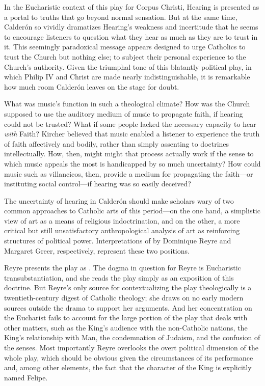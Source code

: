 In the Eucharistic context of this play for Corpus Christi, Hearing is presented as a portal to truths that go beyond normal sensation.
But at the same time, Calderón so vividly dramatizes Hearing's weakness and incertitude that he seems to encourage listeners to question what they hear as much as they are to trust in it.
This seemingly paradoxical message appears designed to urge Catholics to trust the Church but nothing else; to subject their personal experience to the Church's authority.
Given the triumphal tone of this blatantly political play, in which Philip IV and Christ are made nearly indistinguishable, it is remarkable how much room Calderón leaves on the stage for doubt.

What was music's function in such a theological climate?
How was the Church supposed to use the auditory medium of music to propagate faith, if hearing could not be trusted?
What if some people lacked the necessary capacity to hear  \emph{with} Faith?
Kircher believed that music enabled a listener to experience the truth of faith affectively and bodily, rather than simply assenting to doctrines intellectually.
How, then, might might that process actually work if the sense to which music appeals the most is handicapped by so much uncertainty?  
How could music such as villancicos, then, provide a medium for propagating the faith---or instituting social control---if hearing was so easily deceived?

The uncertainty of hearing in Calderón should make scholars wary of two common approaches to Catholic arts of this period---on the one hand, a simplistic view of art as a means of religious indoctrination, and on the other, a more critical but still unsatisfactory anthropological analysis of art as reinforcing structures of political power.
Interpretations of  by Dominique Reyre and Margaret Greer, respectively, represent these two positions.%
  \autocites{Reyre:Retiro}{Greer:Retiro}

Reyre presents the play as .
The dogma in question for Reyre is Eucharistic transubstantiation, and she reads the play simply as an exposition of this doctrine.
But Reyre's only source for contextualizing the play theologically is a twentieth-century digest of Catholic theology; she draws on no early modern sources outside the drama to support her arguments.
And her concentration on the Eucharist fails to account for the large portion of the play that deals with other matters, such as the King's audience with the non-Catholic nations, the King's relationship with Man, the condemnation of Judaism, and the confusion of the senses.
Most importantly Reyre overlooks the overt political dimension of the whole play, which should be obvious given the circumstances of its performance and, among other elements, the fact that the character of the King is explicitly named Felipe.

